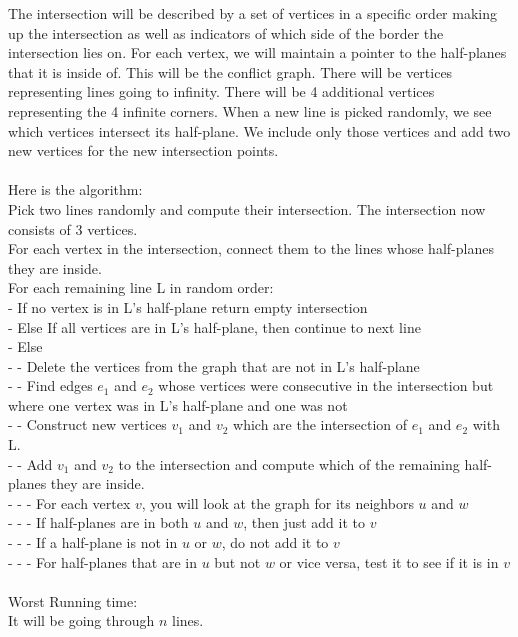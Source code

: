 \documentclass[11pt,psfig]{article}
\begin{document}
The intersection will be described by a set of vertices in a specific order making up the intersection as well as indicators of which side of the border the intersection lies on. For each vertex, we will maintain a pointer to the half-planes that it is inside of. This will be the conflict graph. There will be vertices representing lines going to infinity. There will be 4 additional vertices representing the 4 infinite corners. When a new line is picked randomly, we see which vertices intersect its half-plane. We include only those vertices and add two new vertices for the new intersection points. \\
\\
Here is the algorithm:\\
Pick two lines randomly and compute their intersection. The intersection now consists of 3 vertices. \\
For each vertex in the intersection, connect them to the lines whose half-planes they are inside. \\
For each remaining line L in random order:\\
- If no vertex is in L's half-plane return empty intersection\\
- Else If all vertices are in L's half-plane, then continue to next line\\
- Else \\
- - Delete the vertices from the graph that are not in L's half-plane\\
- - Find edges $e_1$ and $e_2$ whose vertices were consecutive in the intersection but where one vertex was in L's half-plane and one was not\\
- - Construct new vertices $v_1$ and $v_2$ which are the intersection of $e_1$ and $e_2$ with L. \\
- - Add $v_1$ and $v_2$ to the intersection and compute which of the remaining half-planes they are inside. \\
- - - For each vertex $v$, you will look at the graph for its neighbors $u$ and $w$\\
- - - If half-planes are in both $u$ and $w$, then just add it to $v$\\
- - - If a half-plane is not in $u$ or $w$, do not add it to $v$\\
- - - For half-planes that are in $u$ but not $w$ or vice versa, test it to see if it is in $v$\\
\\
Worst Running time:\\
It will be going through $n$ lines. \\
\end{document}
